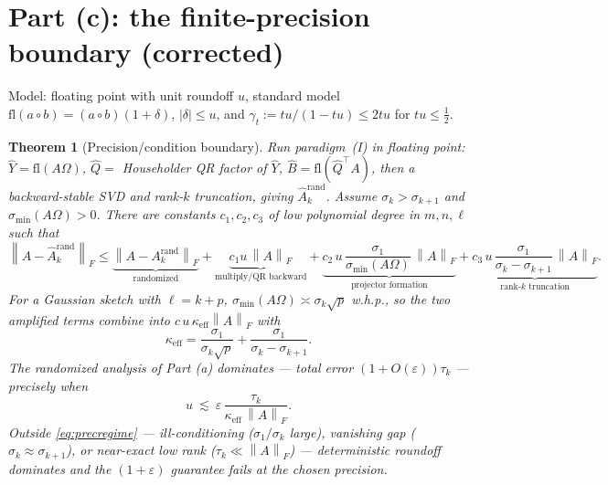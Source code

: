 \documentclass{amsart}
\newtheorem{theorem}{Theorem}
\theoremstyle{definition}
\newcommand{\Frob}[1]{\left\lVert #1\right\rVert_F}
\begin{document}
\section{Part (c): the finite-precision boundary (corrected)}

Model: floating point with unit roundoff $u$, standard model
$\mathrm{fl}(a\circ b)=(a\circ b)(1+\delta)$, $|\delta|\le u$, and
$\gamma_t:=tu/(1-tu)\le2tu$ for $tu\le\tfrac12$.

\begin{theorem}[Precision/condition boundary]\label{thm:precision}
Run paradigm~(I) in floating point: $\widehat Y=\mathrm{fl}(A\Omega)$,
$\widehat Q=$ Householder QR factor of $\widehat Y$,
$\widehat B=\mathrm{fl}(\widehat Q^\top A)$, then a backward-stable SVD and
rank-$k$ truncation, giving $\widehat A_k^{\mathrm{rand}}$. Assume
$\sigma_k>\sigma_{k+1}$ and $\sigma_{\min}(A\Omega)>0$. There are constants
$c_1,c_2,c_3$ of low polynomial degree in $m,n,\ell$ such that
\begin{equation}\label{eq:fperr}
\Frob{A-\widehat A_k^{\mathrm{rand}}}
\le\underbrace{\Frob{A-A_k^{\mathrm{rand}}}}_{\text{randomized}}
+\underbrace{c_1 u\,\Frob A}_{\text{multiply/QR backward}}
+\underbrace{c_2\,u\,\frac{\sigma_1}{\sigma_{\min}(A\Omega)}\,\Frob A}_{\text{projector formation}}
+\underbrace{c_3\,u\,\frac{\sigma_1}{\sigma_k-\sigma_{k+1}}\,\Frob A}_{\text{rank-$k$ truncation}} .
\end{equation}
For a Gaussian sketch with $\ell=k+p$, $\sigma_{\min}(A\Omega)\asymp\sigma_k\sqrt p$
w.h.p., so the two amplified terms combine into $c\,u\,\kappa_{\mathrm{eff}}\Frob A$
with
\begin{equation}\label{eq:keff}
\kappa_{\mathrm{eff}}=\frac{\sigma_1}{\sigma_k\sqrt p}+\frac{\sigma_1}{\sigma_k-\sigma_{k+1}} .
\end{equation}
The randomized analysis of Part (a) dominates --- total error
$(1+O(\varepsilon))\tau_k$ --- precisely when
\begin{equation}\label{eq:precregime}
u\ \lesssim\ \varepsilon\,\frac{\tau_k}{\kappa_{\mathrm{eff}}\,\Frob A} .
\end{equation}
Outside \eqref{eq:precregime} --- ill-conditioning ($\sigma_1/\sigma_k$ large),
vanishing gap ($\sigma_k\approx\sigma_{k+1}$), or near-exact low rank
($\tau_k\ll\Frob A$) --- deterministic roundoff dominates and the
$(1+\varepsilon)$ guarantee fails at the chosen precision.
\end{theorem}
\end{document}
